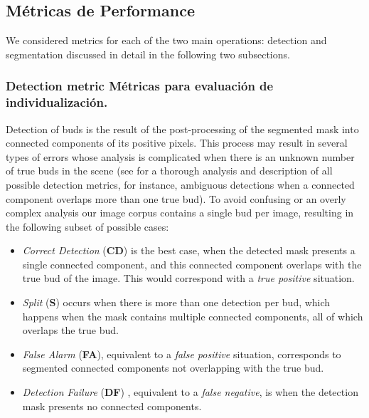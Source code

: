 \documentclass[a4paper,authoryear,review]{elsarticle}
\begin{document}
\subsection{Métricas de Performance}

We considered metrics for each of the two main operations: detection and segmentation discussed in detail in the following two subsections.



\subsubsection{Detection metric Métricas para evaluación de individualización. }

Detection of buds is the result of the post-processing of the segmented mask into connected components of its positive pixels. This process may result in several types of errors whose analysis is complicated when there is an unknown number of true buds in the scene (see \cite{oguz2017dice} for a thorough analysis and description of all possible detection metrics, for instance, ambiguous detections when a connected component overlaps more than one true bud). To avoid confusing or an overly complex analysis our image corpus contains a single bud per image, resulting in the following subset of possible cases:

\begin{itemize}
	\item \emph{Correct Detection} (\textbf{CD}) is the best case, when the detected mask presents a single connected component, and this connected component overlaps with the true bud of the image. This would correspond with a \emph{true positive} situation.
	\item \emph{Split} (\textbf{S}) occurs when there is more than one detection per bud, which happens  when the mask contains multiple connected components, all of which overlaps the true bud. 
	\item \emph{False Alarm} (\textbf{FA}), equivalent to a \emph{false positive} situation, corresponds to segmented connected components not overlapping with the true bud.
	\item \emph{Detection Failure} (\textbf{DF}) , equivalent to a \emph{false negative}, is when the detection mask presents no connected components.
\end{itemize}
\end{document}
